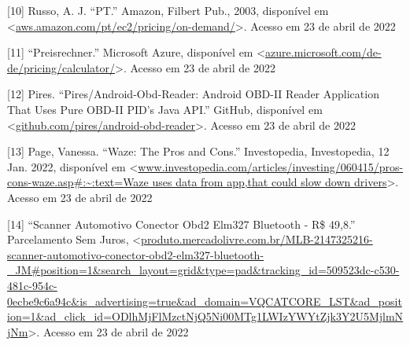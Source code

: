 [10] Russo, A. J. “PT.” Amazon, Filbert Pub., 2003, disponível em <\url{aws.amazon.com/pt/ec2/pricing/on-demand/}>. Acesso em 23 de abril de 2022


[11] “Preisrechner.” Microsoft Azure, disponível em <\url{azure.microsoft.com/de-de/pricing/calculator/}>. Acesso em 23 de abril de 2022

[12] Pires. “Pires/Android-Obd-Reader: Android OBD-II Reader Application That Uses Pure OBD-II PID's Java API.” GitHub, disponível em <\url{github.com/pires/android-obd-reader}>. Acesso em 23 de abril de 2022

[13] Page, Vanessa. “Waze: The Pros and Cons.” Investopedia, Investopedia, 12 Jan. 2022, disponível em <\url{www.investopedia.com/articles/investing/060415/pros-cons-waze.asp#:~:text=Waze uses data from app,that could slow down drivers}>. Acesso em 23 de abril de 2022


[14] “Scanner Automotivo Conector Obd2 Elm327 Bluetooth - R\$ 49,8.” Parcelamento Sem Juros, <\url{produto.mercadolivre.com.br/MLB-2147325216-scanner-automotivo-conector-obd2-elm327-bluetooth-_JM#position=1&search_layout=grid&type=pad&tracking_id=509523dc-c530-481c-954c-0ecbe9c6a94c&is_advertising=true&ad_domain=VQCATCORE_LST&ad_position=1&ad_click_id=ODlhMjFlMzctNjQ5Ni00MTg1LWIzYWYtZjk3Y2U5MjlmNjNm}>. Acesso em 23 de abril de 2022

